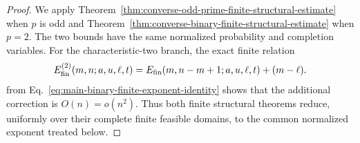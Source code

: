\documentclass[11pt]{article}
\newcommand{\1}{\mathbf 1}
\theoremstyle{plain}
\theoremstyle{definition}
\theoremstyle{remark}
\begin{document}
\begin{proof}
We apply Theorem~\ref{thm:converse-odd-prime-finite-structural-estimate}
when $p$ is odd and
Theorem~\ref{thm:converse-binary-finite-structural-estimate} when $p=2$.
The two bounds have the same normalized probability and completion variables.
For the characteristic-two branch, the exact finite relation
\begin{equation}
 E_{\rm fin}^{(2)}(m,n;a,u,\ell,t)
 =E_{\rm fin}(m,n-m+1;a,u,\ell,t)+(m-\ell).
 \label{eq:direct-finite-binary-odd-exponent-relation}
\end{equation}
from Eq.~\eqref{eq:main-binary-finite-exponent-identity} shows that the
additional correction is $O(n)=o(n^2)$.  Thus both finite structural theorems reduce, uniformly over their complete
finite feasible domains, to the common normalized exponent treated below.


\end{proof}
\end{document}
